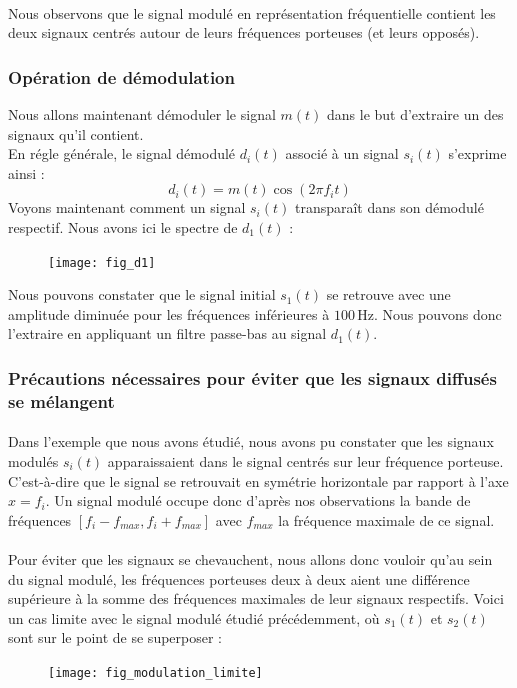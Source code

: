 \documentclass{article}
\begin{document}
\paragraph{}
Nous observons que le signal modulé en représentation fréquentielle contient les deux signaux centrés autour de leurs fréquences porteuses (et leurs opposés).

\subsubsection{Opération de démodulation}
Nous allons maintenant démoduler le signal $m(t)$ dans le but d'extraire un des signaux qu'il contient. \\
En régle générale, le signal démodulé $d_i(t)$ associé à un signal $s_i(t)$ s'exprime ainsi :
$$d_i(t)=m(t)\cos(2\pi f_i t)$$
\newpage
Voyons maintenant comment un signal $s_i(t)$ transparaît dans son démodulé respectif. Nous avons ici le spectre de $d_1(t)$ :
\begin{figure}[h]
\texttt{[image: fig\_d1]}
\centering
\end{figure}
Nous pouvons constater que le signal initial $s_1(t)$ se retrouve avec une amplitude diminuée pour les fréquences inférieures à $100\,\mathrm{Hz}$. Nous pouvons donc l'extraire en appliquant un filtre passe-bas au signal $d_1(t)$.

\subsubsection{Précautions nécessaires pour éviter que les signaux diffusés se mélangent}
\paragraph{}
Dans l'exemple que nous avons étudié, nous avons pu constater que les signaux modulés $s_i(t)$ apparaissaient dans le signal centrés sur leur fréquence porteuse. C'est-à-dire que le signal se retrouvait en symétrie horizontale par rapport à l'axe $x=f_i$. Un signal modulé occupe donc d'après nos observations la bande de fréquences $[f_i-f_{max},f_i+f_{max}]$ avec $f_{max}$ la fréquence maximale de ce signal.
\paragraph{}
Pour éviter que les signaux se chevauchent, nous allons donc vouloir qu'au sein du signal modulé, les fréquences porteuses deux à deux aient une différence supérieure à la somme des fréquences maximales de leur signaux respectifs.
\newpage
Voici un cas limite avec le signal modulé étudié précédemment, où $s_1(t)$ et $s_2(t)$ sont sur le point de se superposer :
\begin{figure}[h]
\texttt{[image: fig\_modulation\_limite]}
\centering
\end{figure}
\end{document}
